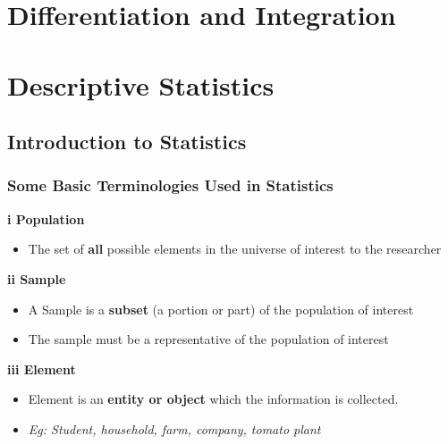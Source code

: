 \documentclass[]{book}
\providecommand{\tightlist}{%
  \setlength{\itemsep}{0pt}\setlength{\parskip}{0pt}}
\begin{document}
\hypertarget{differentiation-and-integration}{%
\chapter{Differentiation and Integration}\label{differentiation-and-integration}}

\hypertarget{descriptive-statistics}{%
\chapter{Descriptive Statistics}\label{descriptive-statistics}}


\hypertarget{introduction-to-statistics}{%
\section{Introduction to Statistics}\label{introduction-to-statistics}}

\hypertarget{some-basic-terminologies-used-in-statistics}{%
\subsection{Some Basic Terminologies Used in Statistics}\label{some-basic-terminologies-used-in-statistics}}

\textbf{i Population}

\begin{itemize}
\tightlist
\item
  The set of \textbf{all} possible elements in the universe of interest to the researcher
\end{itemize}

\textbf{ii Sample}

\begin{itemize}
\tightlist
\item
  A Sample is a \textbf{subset} (a portion or part) of the population of interest
\item
  The sample must be a representative of the population of interest
\end{itemize}

\textbf{iii Element}

\begin{itemize}
\tightlist
\item
  Element is an \textbf{entity or object} which the information is collected.
\item
  \emph{Eg: Student, household, farm, company, tomato plant}
\end{itemize}
\end{document}
